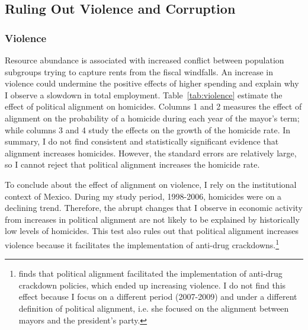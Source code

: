 \documentclass[dv_diss_main.tex]{subfiles}
\begin{document}
\subsection{Ruling Out Violence and Corruption}

\subsubsection{Violence}   Resource abundance is associated with increased conflict between population subgroups trying to capture rents from the fiscal windfalls. An increase in violence could undermine the positive effects of higher spending and explain why I observe a slowdown in total employment. Table~\ref{tab:violence} estimate the effect of political alignment on homicides. Columns 1 and 2 measures the effect of alignment on the probability of a homicide during each year of the mayor's term; while columns 3 and 4 study the effects on the growth of the homicide rate. In summary, I do not find consistent and statistically significant evidence that alignment increases homicides. However, the standard errors are relatively large, so I cannot reject that political alignment increases the homicide rate.

To conclude about the effect of alignment on violence, I rely on the institutional context of Mexico. During my study period, 1998-2006, homicides were on a declining trend. Therefore, the abrupt changes that I observe in economic activity from increases in political alignment are not likely to be explained by historically low levels of homicides. This test also rules out that political alignment increases violence because it facilitates the implementation of anti-drug  crackdowns.\footnote{\citep{dell2015trafficking} finds that political alignment facilitated the implementation of anti-drug crackdown policies, which ended up increasing violence. I do not find this effect because I focus on a different period (2007-2009) and under a different definition of political alignment, i.e. she focused on the alignment between mayors and the president's party.} 

\end{document}
